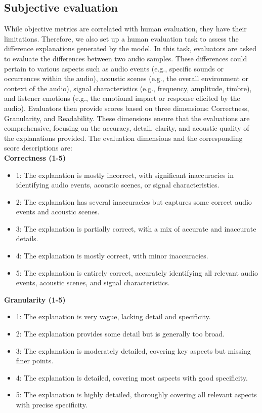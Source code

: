 \subsection{Subjective evaluation} \label{appendix: human evaluation}
\vspace{-0.1in}
While objective metrics are correlated with human evaluation, they have their limitations. Therefore, we also set up a human evaluation task to assess the difference explanations generated by the model. In this task, evaluators are asked to evaluate the differences between two audio samples. These differences could pertain to various aspects such as audio events (e.g., specific sounds or occurrences within the audio), acoustic scenes (e.g., the overall environment or context of the audio), signal characteristics (e.g., frequency, amplitude, timbre), and listener emotions (e.g., the emotional impact or response elicited by the audio). Evaluators then provide scores based on three dimensions: Correctness, Granularity, and Readability. These dimensions ensure that the evaluations are comprehensive, focusing on the accuracy, detail, clarity, and acoustic quality of the explanations provided. The evaluation dimensions and the corresponding score descriptions are: \\
\textbf{Correctness (1-5)} \vspace{-0.1in}
\begin{itemize}
    \item 1: The explanation is mostly incorrect, with significant inaccuracies in identifying audio events, acoustic scenes, or signal characteristics.
    \item 2: The explanation has several inaccuracies but captures some correct audio events and acoustic scenes.
    \item 3: The explanation is partially correct, with a mix of accurate and inaccurate details.
    \item 4: The explanation is mostly correct, with minor inaccuracies.
    \item 5: The explanation is entirely correct, accurately identifying all relevant audio events, acoustic scenes, and signal characteristics.
\end{itemize} \vspace{-0.1in}
\textbf{Granularity (1-5)}  \vspace{-0.1in}
\begin{itemize}
    \item 1: The explanation is very vague, lacking detail and specificity.
    \item 2: The explanation provides some detail but is generally too broad.
    \item 3: The explanation is moderately detailed, covering key aspects but missing finer points.
    \item 4: The explanation is detailed, covering most aspects with good specificity.
    \item 5: The explanation is highly detailed, thoroughly covering all relevant aspects with precise specificity.
\end{itemize} \vspace{-0.1in}
